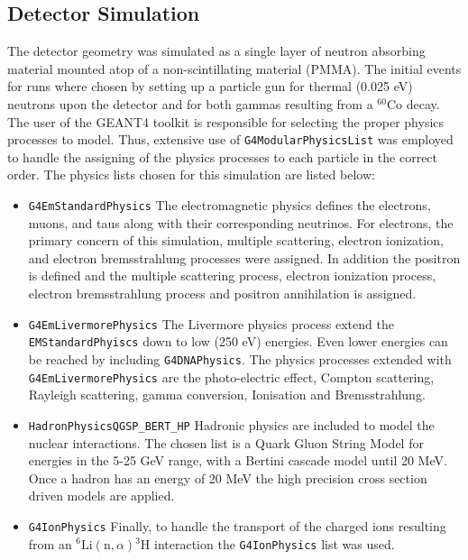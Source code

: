 \documentclass{anstrans}
\newcommand{\iso}[2]{${}^{#2}${#1}}
\begin{document}
\subsection{Detector Simulation}
The detector geometry was simulated as a single layer of neutron absorbing material mounted atop of a non-scintillating material (PMMA).
The initial events for runs where chosen by setting up a particle gun for thermal (0.025 eV) neutrons upon the detector and for both gammas resulting from a \iso{Co}{60} decay.
The user of the GEANT4 toolkit is responsible for selecting the proper physics processes to model.
Thus, extensive use of \verb+G4ModularPhysicsList+ was employed to handle the assigning of the physics processes to each particle in the correct order.
The physics lists chosen for this simulation are listed below:
\begin{itemize}
   \item \verb+G4EmStandardPhysics+ The electromagnetic physics defines the electrons, muons, and taus along with their corresponding neutrinos. For electrons, the primary concern of this simulation, multiple scattering, electron ionization, and electron bremsstrahlung processes were assigned.  In addition the positron is defined and the multiple scattering process, electron ionization process, electron bremsstrahlung process and positron annihilation is assigned.
    \item \verb+G4EmLivermorePhysics+ The Livermore physics process extend the \verb+EMStandardPhyiscs+ down to low (250 eV) energies. Even lower energies can be reached by including \verb+G4DNAPhysics+. The physics processes extended with \verb+G4EmLivermorePhysics+ are the photo-electric effect, Compton scattering, Rayleigh scattering, gamma conversion, Ionisation and Bremsstrahlung. 
    \item \verb+HadronPhysicsQGSP_BERT_HP+ Hadronic physics are included to model the nuclear interactions. The chosen list is a Quark Gluon String Model for energies in the 5-25 GeV range, with a Bertini cascade model until 20 MeV.  Once a hadron has an energy of 20 MeV the high precision cross section driven models are applied.
    \item \verb+G4IonPhysics+ Finally, to handle the transport of the charged ions resulting from an ${}^6\text{Li}(\text{n},\alpha){}^{3}\text{H}$ interaction the \verb+G4IonPhysics+ list was used.
\end{itemize}
\end{document}
